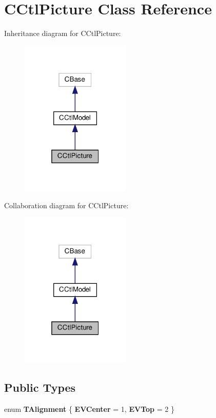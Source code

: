 \hypertarget{classCCtlPicture}{}\section{C\+Ctl\+Picture Class Reference}
\label{classCCtlPicture}


Inheritance diagram for C\+Ctl\+Picture\+:
\nopagebreak
\begin{figure}[H]
\begin{center}
\leavevmode
\includegraphics[width=148pt]{classCCtlPicture__inherit__graph}
\end{center}
\end{figure}


Collaboration diagram for C\+Ctl\+Picture\+:
\nopagebreak
\begin{figure}[H]
\begin{center}
\leavevmode
\includegraphics[width=148pt]{classCCtlPicture__coll__graph}
\end{center}
\end{figure}
\subsection*{Public Types}
\begin{DoxyCompactItemize}
\item 
\mbox{\label{classCCtlPicture_ac613a207c19c1190c12302eda6b492b8}} 
enum {\bfseries T\+Alignment} \{ {\bfseries E\+V\+Center} = 1, 
{\bfseries E\+V\+Top} = 2
 \}
\end{DoxyCompactItemize}
